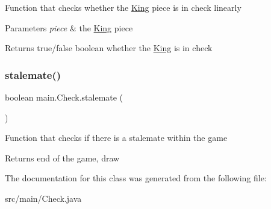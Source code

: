 Function that checks whether the \hyperlink{classmain_1_1_king}{King} piece is in check linearly 
\begin{DoxyParams}{Parameters}
{\em piece} & the \hyperlink{classmain_1_1_king}{King} piece \\
\hline
\end{DoxyParams}
\begin{DoxyReturn}{Returns}
true/false boolean whether the \hyperlink{classmain_1_1_king}{King} is in check 
\end{DoxyReturn}
\mbox{\label{classmain_1_1_check_ac4c3ae82761a5bf3649785f8e97f29ce}} 
\subsubsection{\texorpdfstring{stalemate()}{stalemate()}}
{\footnotesize\ttfamily boolean main.\+Check.\+stalemate (\begin{DoxyParamCaption}{ }\end{DoxyParamCaption})}

Function that checks if there is a stalemate within the game \begin{DoxyReturn}{Returns}
end of the game, draw 
\end{DoxyReturn}


The documentation for this class was generated from the following file\+:\begin{DoxyCompactItemize}
\item 
src/main/Check.\+java\end{DoxyCompactItemize}
